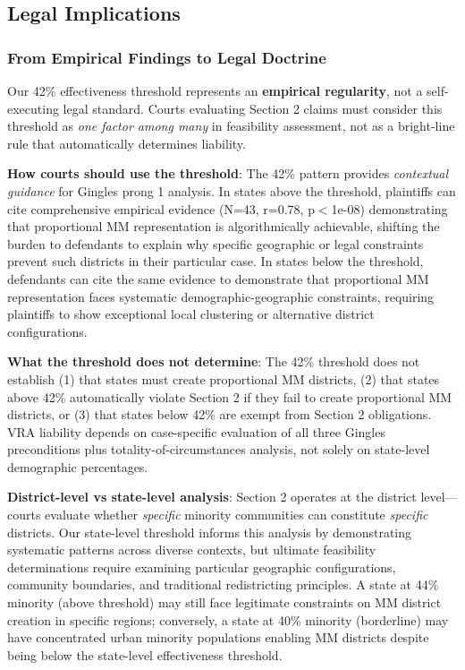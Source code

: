 \subsection{Legal Implications}

\subsubsection{From Empirical Findings to Legal Doctrine}

Our 42\% effectiveness threshold represents an \textbf{empirical regularity}, not a self-executing legal standard. Courts evaluating Section 2 claims must consider this threshold as \emph{one factor among many} in feasibility assessment, not as a bright-line rule that automatically determines liability.

\textbf{How courts should use the threshold}: The 42\% pattern provides \emph{contextual guidance} for Gingles prong 1 analysis. In states above the threshold, plaintiffs can cite comprehensive empirical evidence (N=43, r=0.78, p$<$1e-08) demonstrating that proportional MM representation is algorithmically achievable, shifting the burden to defendants to explain why specific geographic or legal constraints prevent such districts in their particular case. In states below the threshold, defendants can cite the same evidence to demonstrate that proportional MM representation faces systematic demographic-geographic constraints, requiring plaintiffs to show exceptional local clustering or alternative district configurations.

\textbf{What the threshold does not determine}: The 42\% threshold does not establish (1) that states must create proportional MM districts, (2) that states above 42\% automatically violate Section 2 if they fail to create proportional MM districts, or (3) that states below 42\% are exempt from Section 2 obligations. VRA liability depends on case-specific evaluation of all three Gingles preconditions plus totality-of-circumstances analysis, not solely on state-level demographic percentages.

\textbf{District-level vs state-level analysis}: Section 2 operates at the district level---courts evaluate whether \emph{specific} minority communities can constitute \emph{specific} districts. Our state-level threshold informs this analysis by demonstrating systematic patterns across diverse contexts, but ultimate feasibility determinations require examining particular geographic configurations, community boundaries, and traditional redistricting principles. A state at 44\% minority (above threshold) may still face legitimate constraints on MM district creation in specific regions; conversely, a state at 40\% minority (borderline) may have concentrated urban minority populations enabling MM districts despite being below the state-level effectiveness threshold.

